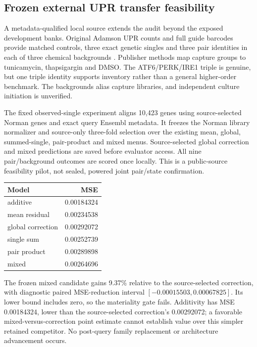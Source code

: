 \subsection{Frozen external UPR transfer feasibility}

A metadata-qualified local source extends the audit beyond the exposed development banks. Original Adamson UPR counts and full guide barcodes provide matched controls, three exact genetic singles and three pair identities in each of three chemical backgrounds \citep{adamson2016}. Publisher methods map capture groups to tunicamycin, thapsigargin and DMSO. The ATF6/PERK/IRE1 triple is genuine, but one triple identity supports inventory rather than a general higher-order benchmark. The backgrounds alias capture libraries, and independent culture initiation is unverified.

The fixed observed-single experiment aligns 10,423 genes using source-selected Norman genes and exact query Ensembl metadata. It freezes the Norman library normalizer and source-only three-fold selection over the existing mean, global, summed-single, pair-product and mixed menus. Source-selected global correction and mixed predictions are saved before evaluator access. All nine pair/background outcomes are scored once locally. This is a public-source feasibility pilot, not sealed, powered joint pair/state confirmation.

\begin{center}\small\begin{tabular}{lr}\toprule Model & MSE\\\midrule

additive & 0.00184324\\

mean residual & 0.00234538\\

global correction & 0.00292072\\

single sum & 0.00252739\\

pair product & 0.00289898\\

mixed & 0.00264696\\

\bottomrule\end{tabular}\end{center}

The frozen mixed candidate gains 9.37\% relative to the source-selected correction, with diagnostic paired MSE-reduction interval $[-0.00015503,0.00067825]$. Its lower bound includes zero, so the materiality gate fails. Additivity has MSE 0.00184324, lower than the source-selected correction's 0.00292072; a favorable mixed-versus-correction point estimate cannot establish value over this simpler retained competitor. No post-query family replacement or architecture advancement occurs.

